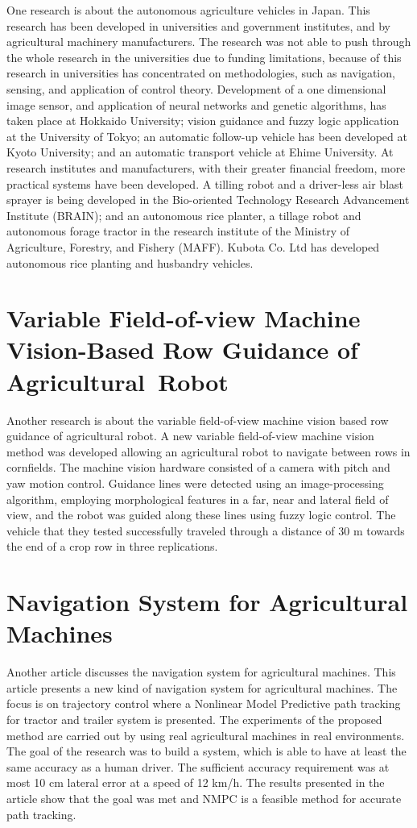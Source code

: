 One research is about the autonomous agriculture vehicles in Japan. This research has been developed in universities and government institutes, and by agricultural machinery manufacturers. The research was not able to push through the whole research in the universities due to funding limitations, because of this research in universities has concentrated on methodologies, such as navigation, sensing, and application of control theory. Development of a one dimensional image sensor, and application of neural networks and genetic algorithms, has taken place at Hokkaido University; vision guidance and fuzzy logic application at the University of Tokyo; an automatic follow-up vehicle has been developed at Kyoto University; and an automatic transport vehicle at Ehime University. At research institutes and manufacturers, with their greater financial freedom, more practical systems have been developed. A tilling robot and a driver-less air blast sprayer is being developed in the Bio-oriented Technology Research Advancement Institute (BRAIN); and an autonomous rice planter, a tillage robot and autonomous forage tractor in the research institute of the Ministry of Agriculture, Forestry, and Fishery (MAFF). Kubota Co. Ltd has developed autonomous rice planting and husbandry vehicles. 

\section{Variable Field-of-view Machine Vision-Based Row Guidance of Agricultural~Robot}

Another research is about the variable field-of-view machine vision based row guidance of agricultural robot. A new variable field-of-view machine vision method was developed allowing an agricultural robot to navigate between rows in cornfields. The machine vision hardware consisted of a camera with pitch and yaw motion control. Guidance lines were detected using an image-processing algorithm, employing morphological features in a far, near and lateral field of view, and the robot was guided along these lines using fuzzy logic control. The vehicle that they tested successfully traveled through a distance of 30 m towards the end of a crop row in three replications. 

\section{Navigation System for Agricultural Machines}

Another article discusses the navigation system for agricultural machines. This article presents a new kind of navigation system for agricultural machines. The focus is on trajectory control where a Nonlinear Model Predictive path tracking for tractor and trailer system is presented. The experiments of the proposed method are carried out by using real agricultural machines in real environments. The goal of the research was to build a system, which is able to have at least the same accuracy as a human driver. The sufficient accuracy requirement was at most 10 cm lateral error at a speed of 12 km/h. The results presented in the article show that the goal was met and NMPC is a feasible method for accurate path tracking. 